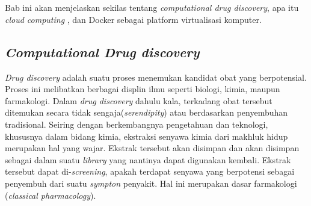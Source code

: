 \chapter{\babDua}
Bab ini akan menjelaskan sekilas tentang \textit{computational drug discovery}, apa itu \textit{cloud computing} , dan Docker sebagai platform virtualisasi komputer. 
\section{\textit{Computational Drug discovery}}
\hspace{0.5cm}\textit{Drug discovery} adalah suatu proses menemukan kandidat obat yang berpotensial. Proses ini melibatkan berbagai displin ilmu seperti biologi, kimia, maupun farmakologi. Dalam \textit{drug discovery} dahulu kala, terkadang obat tersebut ditemukan secara tidak sengaja(\textit{serendipity}) atau berdasarkan penyembuhan tradisional. Seiring dengan berkembangnya pengetahuan dan teknologi, khususnya dalam bidang kimia, ekstraksi senyawa kimia dari makhluk hidup merupakan hal yang wajar. Ekstrak tersebut akan disimpan dan akan disimpan sebagai dalam suatu \textit{library} yang nantinya dapat digunakan kembali. Ekstrak tersebut dapat di-\textit{screening}, apakah terdapat senyawa yang berpotensi sebagai penyembuh dari suatu \textit{sympton} penyakit. Hal ini merupakan dasar farmakologi (\textit{classical pharmacology}).

